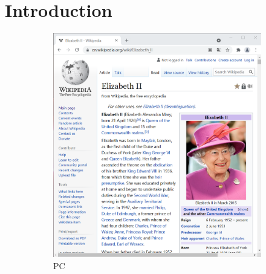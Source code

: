 \section{Introduction}

\begin{figure}[t]
\centering
\begin{subfigure}{0.36\textwidth}
  \centering
  \includegraphics[width=1\textwidth]{intropage_pc}
  \caption{PC}
  \label{intropage_pc}
\end{subfigure}%
\hspace{0.25in}
\begin{subfigure}{0.3\textwidth}
  \centering

\end{subfigure}
\end{figure}
